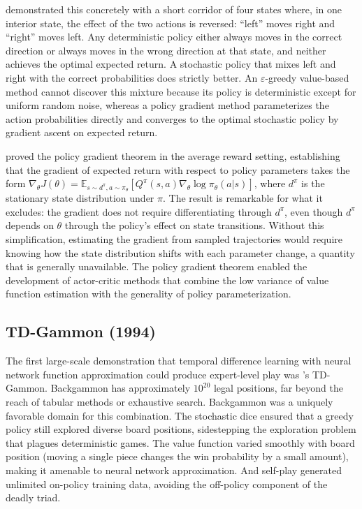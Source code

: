 \citet{SuttonMcAllester2000} demonstrated this concretely with a short corridor of four states where, in one interior state, the effect of the two actions is reversed: ``left'' moves right and ``right'' moves left. Any deterministic policy either always moves in the correct direction or always moves in the wrong direction at that state, and neither achieves the optimal expected return. A stochastic policy that mixes left and right with the correct probabilities does strictly better. An $\varepsilon$-greedy value-based method cannot discover this mixture because its policy is deterministic except for uniform random noise, whereas a policy gradient method parameterizes the action probabilities directly and converges to the optimal stochastic policy by gradient ascent on expected return.

\citet{SuttonMcAllester2000} proved the policy gradient theorem in the average reward setting, establishing that the gradient of expected return with respect to policy parameters takes the form $\nabla_\theta J(\theta) = \mathbb{E}_{s \sim d^\pi, a \sim \pi_\theta} [Q^\pi(s,a) \nabla_\theta \log \pi_\theta(a|s)]$, where $d^\pi$ is the stationary state distribution under $\pi$. The result is remarkable for what it excludes: the gradient does not require differentiating through $d^\pi$, even though $d^\pi$ depends on $\theta$ through the policy's effect on state transitions. Without this simplification, estimating the gradient from sampled trajectories would require knowing how the state distribution shifts with each parameter change, a quantity that is generally unavailable. The policy gradient theorem enabled the development of actor-critic methods that combine the low variance of value function estimation with the generality of policy parameterization.

\subsection{TD-Gammon (1994)}

The first large-scale demonstration that temporal difference learning with neural network function approximation could produce expert-level play was \citet{tesauro1994}'s TD-Gammon. Backgammon has approximately $10^{20}$ legal positions, far beyond the reach of tabular methods or exhaustive search. Backgammon was a uniquely favorable domain for this combination. The stochastic dice ensured that a greedy policy still explored diverse board positions, sidestepping the exploration problem that plagues deterministic games. The value function varied smoothly with board position (moving a single piece changes the win probability by a small amount), making it amenable to neural network approximation. And self-play generated unlimited on-policy training data, avoiding the off-policy component of the deadly triad.

